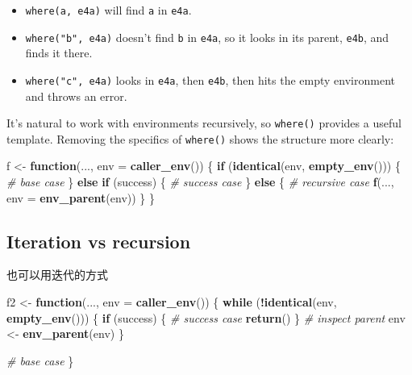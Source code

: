 \documentclass[]{book}
\newenvironment{Shaded}{\begin{snugshade}}{\end{snugshade}}
\newcommand{\CommentTok}[1]{\textcolor[rgb]{0.56,0.35,0.01}{\textit{#1}}}
\newcommand{\ControlFlowTok}[1]{\textcolor[rgb]{0.13,0.29,0.53}{\textbf{#1}}}
\newcommand{\DataTypeTok}[1]{\textcolor[rgb]{0.13,0.29,0.53}{#1}}
\newcommand{\KeywordTok}[1]{\textcolor[rgb]{0.13,0.29,0.53}{\textbf{#1}}}
\newcommand{\NormalTok}[1]{#1}
\newcommand{\OperatorTok}[1]{\textcolor[rgb]{0.81,0.36,0.00}{\textbf{#1}}}
\newcommand{\StringTok}[1]{\textcolor[rgb]{0.31,0.60,0.02}{#1}}
\theoremstyle{definition}
\theoremstyle{definition}
\theoremstyle{definition}
\theoremstyle{remark}
\begin{document}
\begin{itemize}
\item
  \texttt{where(a,\ e4a)} will find \texttt{a} in \texttt{e4a}.
\item
  \texttt{where("b",\ e4a)} doesn't find \texttt{b} in \texttt{e4a}, so
  it looks in its parent, \texttt{e4b}, and finds it there.
\item
  \texttt{where("c",\ e4a)} looks in \texttt{e4a}, then \texttt{e4b},
  then hits the empty environment and throws an error.
\end{itemize}

It's natural to work with environments recursively, so \texttt{where()}
provides a useful template. Removing the specifics of \texttt{where()}
shows the structure more clearly:

\begin{Shaded}
\begin{Highlighting}[]
\NormalTok{f <-}\StringTok{ }\ControlFlowTok{function}\NormalTok{(..., }\DataTypeTok{env =} \KeywordTok{caller_env}\NormalTok{()) \{}
  \ControlFlowTok{if}\NormalTok{ (}\KeywordTok{identical}\NormalTok{(env, }\KeywordTok{empty_env}\NormalTok{())) \{}
    \CommentTok{# base case}
\NormalTok{  \} }\ControlFlowTok{else} \ControlFlowTok{if}\NormalTok{ (success) \{}
    \CommentTok{# success case}
\NormalTok{  \} }\ControlFlowTok{else}\NormalTok{ \{}
    \CommentTok{# recursive case}
    \KeywordTok{f}\NormalTok{(..., }\DataTypeTok{env =} \KeywordTok{env_parent}\NormalTok{(env))}
\NormalTok{  \}}
\NormalTok{\}}
\end{Highlighting}
\end{Shaded}

\hypertarget{iteration-vs-recursion}{%
\subsection*{Iteration vs recursion}\label{iteration-vs-recursion}}

也可以用迭代的方式

\begin{Shaded}
\begin{Highlighting}[]
\NormalTok{f2 <-}\StringTok{ }\ControlFlowTok{function}\NormalTok{(..., }\DataTypeTok{env =} \KeywordTok{caller_env}\NormalTok{()) \{}
  \ControlFlowTok{while}\NormalTok{ (}\OperatorTok{!}\KeywordTok{identical}\NormalTok{(env, }\KeywordTok{empty_env}\NormalTok{())) \{}
    \ControlFlowTok{if}\NormalTok{ (success) \{}
      \CommentTok{# success case}
      \KeywordTok{return}\NormalTok{()}
\NormalTok{    \}}
    \CommentTok{# inspect parent}
\NormalTok{    env <-}\StringTok{ }\KeywordTok{env_parent}\NormalTok{(env)}
\NormalTok{  \}}

  \CommentTok{# base case}
\NormalTok{\}}
\end{Highlighting}
\end{Shaded}
\end{document}
